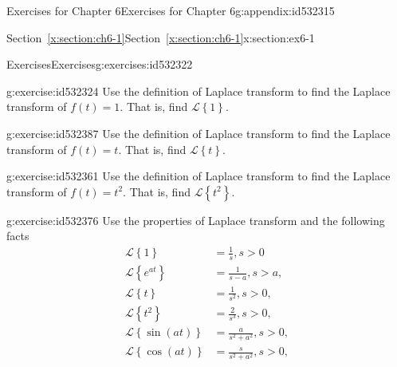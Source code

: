 \documentclass[oneside,10pt,]{book}
\newcommand{\xreffont}{\relax}
\numberwithin{equation}{section}
\numberwithin{equation}{section}
\newcommand{\amp}{&}
\begin{document}
%
%
\typeout{************************************************}
\typeout{************************************************}
%
\begin{appendixptx}{Exercises for Chapter 6}{}{Exercises for Chapter 6}{}{}{g:appendix:id532315}
%
%
\typeout{************************************************}
\typeout{Section G.1 Section~{\xreffont\ref*{x:section:ch6-1}}}
\typeout{************************************************}
%
\begin{sectionptx}{Section~{\xreffont\ref*{x:section:ch6-1}}}{}{Section~{\xreffont\ref*{x:section:ch6-1}}}{}{}{x:section:ex6-1}
%
%
\typeout{************************************************}
\typeout{************************************************}
%
\begin{exercises-subsection-numberless}{Exercises}{}{Exercises}{}{}{g:exercises:id532322}
\begin{divisionexercise}{1}{}{}{g:exercise:id532324}%
Use the definition of Laplace transform to find the Laplace transform of \(f(t)=1\). That is, find \(\mathcal{L}\left\{ 1\right\} .\)%
\end{divisionexercise}%
\begin{divisionexercise}{2}{}{}{g:exercise:id532387}%
Use the definition of Laplace transform to find the Laplace transform of \(f(t)=t\). That is, find \(\mathcal{L}\left\{ t\right\} .\)%
\end{divisionexercise}%
\begin{divisionexercise}{3}{}{}{g:exercise:id532361}%
Use the definition of Laplace transform to find the Laplace transform of \(f(t)=t^{2}\). That is, find \(\mathcal{L}\left\{ t^{2}\right\} .\)%
\end{divisionexercise}%
\begin{divisionexercise}{4}{}{}{g:exercise:id532376}%
Use the properties of Laplace transform and the following facts%
\begin{align*}
\mathcal{L}\left\{ 1\right\}  \amp =\frac{1}{s},s>0\\
\mathcal{L}\left\{ e^{at}\right\}  \amp =\frac{1}{s-a},s>a,\\
\mathcal{L}\left\{ t\right\}  \amp =\frac{1}{s^{2}},s>0,\\
\mathcal{L}\left\{ t^{2}\right\}  \amp =\frac{2}{s^{3}},s>0,\\
\mathcal{L}\left\{ \sin(at)\right\}  \amp =\frac{a}{s^{2}+a^{2}},s>0,\\
\mathcal{L}\left\{ \cos(at)\right\}  \amp =\frac{s}{s^{2}+a^{2}},s>0,

\end{align*}
\end{divisionexercise}
\end{exercises-subsection-numberless}
\end{sectionptx}
\end{appendixptx}
\end{document}
